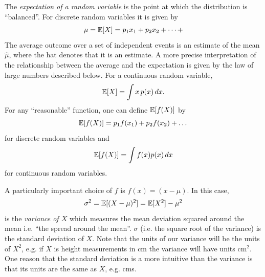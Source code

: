 The  \emph{expectation
  of a random variable} is the point at which the distribution is
``balanced''. For discrete random variables it is given by 
\begin{equation}
\mu = \mathbb{E}[X]=p_1x_1+p_2x_2+\dots + 
\end{equation} 
The average outcome 
over a set of independent
events is an estimate of the mean $\hat{\mu}$, where the hat denotes
that it is an estimate. A more precise interpretation of the
relationship between the average and the expectation is given by the law of large numbers described below. For a continuous random variable, 
\begin{equation}
\mathbb{E}[X]=\int x\,p(x)\,dx.
\end{equation}
For any ``reasonable'' function, one can define $\mathbb{E}[f(X)]$ by %
\begin{equation}
\mathbb{E}[f(X)]=p_1f(x_1)+p_2 f(x_2)+\dots
\end{equation}
for discrete random variables and 
\begin{equation}
\mathbb{E}[f(X)]=\int f(x)p(x)\,dx
\end{equation}
for continuous random variables. 

A particularly important choice of $f$ is $f(x)=(x-\mu)$. In this case, 
\begin{equation}
\sigma^2 = \mathbb{E}[(X-\mu)^2]= \mathbb{E}[X^2]-\mu^2
\end{equation}
is the  \emph{variance of $X$} which measures the mean deviation
squared around the mean i.e. ``the spread around the mean''. $\sigma$
(i.e. the square root of the variance) is the standard deviation of
$X$.
Note that the units of our variance will be the units of $X^2$,
e.g. if $X$ is height measurements in cm the variance will have units
cm$^2$. One reason that the standard deviation is a more intuitive
than the variance is that its units are the same as $X$, e.g.  cms. 

